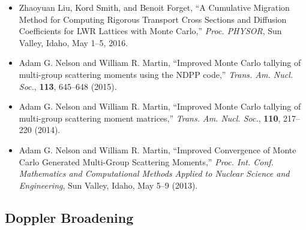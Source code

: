 \begin{itemize}
\item Zhaoyuan Liu, Kord Smith, and Benoit Forget, ``A Cumulative Migration Method
for Computing Rigorous Transport Cross Sections and Diffusion Coefficients for
LWR Lattices with Monte Carlo,'' \textit{Proc. PHYSOR}, Sun Valley, Idaho, May
1--5, 2016.

\item Adam G. Nelson and William R. Martin, ``Improved Monte Carlo tallying of
multi-group scattering moments using the NDPP code,'' \textit{Trans. Am. Nucl. Soc.},
\textbf{113}, 645--648 (2015).

\item Adam G. Nelson and William R. Martin, ``Improved Monte Carlo tallying of
multi-group scattering moment matrices,'' \textit{Trans. Am. Nucl. Soc.}, \textbf{110},
217--220 (2014).

\item Adam G. Nelson and William R. Martin, ``Improved Convergence of Monte Carlo
Generated Multi-Group Scattering Moments,'' \textit{Proc. Int. Conf. Mathematics and
Computational Methods Applied to Nuclear Science and Engineering}, Sun Valley,
Idaho, May 5--9 (2013).

\end{itemize}

\subsection{Doppler Broadening}


